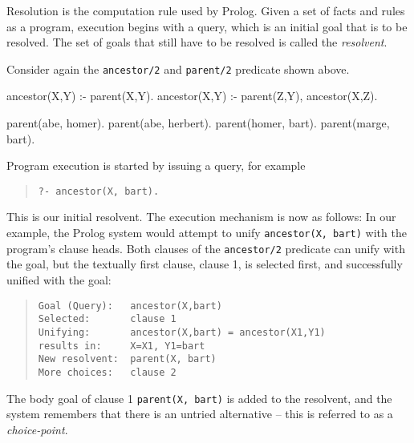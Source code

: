  
Resolution is the computation rule used by Prolog. Given a set of
facts and rules as a program, execution begins with a query, which is
an initial goal that is to be resolved.
The set of goals that still have to be resolved is called the
{\em resolvent}.

Consider again the {\tt ancestor/2}
and {\tt parent/2} predicate shown above.
\begin{code}
ancestor(X,Y) :- parent(X,Y).                 %
ancestor(X,Y) :- parent(Z,Y), ancestor(X,Z).  %

parent(abe, homer).                           %
parent(abe, herbert).                         %
parent(homer, bart).                          %
parent(marge, bart).                          %
\end{code}
Program execution is started by issuing a query, for example
\begin{quote}\begin{verbatim}
?- ancestor(X, bart).
\end{verbatim}\end{quote}
This is our initial resolvent.
The execution mechanism is now as follows:
In our example, the Prolog system would attempt to unify
{\tt ancestor(X, bart)} with the program's
clause heads. Both clauses of the {\tt ancestor/2} predicate can
unify with the goal, but the textually first clause, clause 1, is
selected first, and successfully unified with the goal:
\begin{quote}\begin{verbatim}
Goal (Query):   ancestor(X,bart)
Selected:       clause 1
Unifying:       ancestor(X,bart) = ancestor(X1,Y1)
results in:     X=X1, Y1=bart
New resolvent:  parent(X, bart)
More choices:   clause 2
\end{verbatim}\end{quote}
The body goal of clause 1 \verb'parent(X, bart)' is added to the
resolvent, and the system remembers that there is an untried 
alternative -- this is referred to as a {\it choice-point}.

